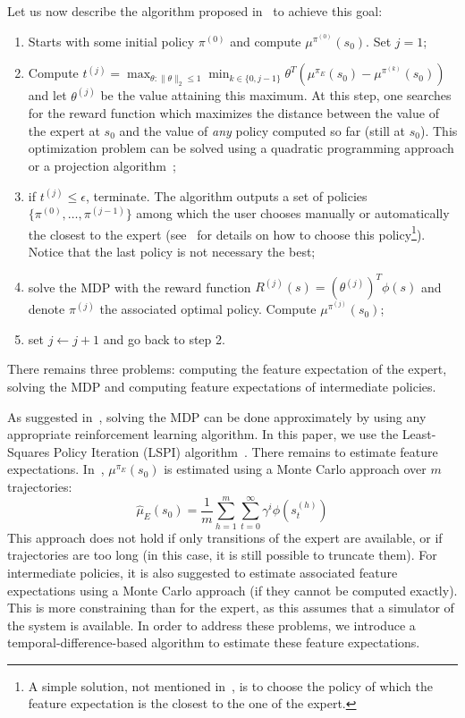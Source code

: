 \documentclass{article}
\begin{document}
Let us now describe the algorithm proposed in~\citep{abbeel2004apprenticeship} to
achieve this goal:
\begin{enumerate}
  \item Starts with some initial policy $\pi^{(0)}$ and compute
  $\mu^{\pi^{(0)}}(s_0)$. Set $j=1$;
  \item Compute $t^{(j)} = \max_{\theta: \|\theta\|_2\leq 1}
  \min_{k\in\{0,j-1\}}\theta^T(\mu^{\pi_E}(s_0) -
  \mu^{\pi^{(k)}}(s_0))$ and let $\theta^{(j)}$ be the value
  attaining this maximum. At this step, one searches for the reward
  function which maximizes the distance between the value of the
  expert at $s_0$ and the value of \emph{any} policy computed so far
  (still at $s_0$). This optimization problem can be solved using a
  quadratic programming approach or a projection
  algorithm~\citep{abbeel2004apprenticeship};
  \item if $t^{(j)}\leq \epsilon$, terminate. The algorithm outputs a
  set of policies $\{\pi^{(0)}, \dots, \pi^{(j-1)}\}$ among which
  the user chooses manually or automatically the closest to the
  expert (see~\citep{abbeel2004apprenticeship} for details on how to choose this
  policy\footnote{A simple solution, not mentioned in~\citep{abbeel2004apprenticeship},
  is to choose the policy of which the feature expectation is the
  closest to the one of the expert.}).
  Notice that the last policy is not necessary the best;
  \item solve the MDP with the reward function $R^{(j)}(s) =
  (\theta^{(j)})^T\phi(s)$ and denote $\pi^{(j)}$ the associated
  optimal policy. Compute $\mu^{\pi^{(j)}}(s_0)$;
  \item set $j\leftarrow j+1$ and go back to step 2.
\end{enumerate}
There remains three problems: computing the feature expectation of
the expert, solving the MDP and computing feature expectations of
intermediate policies.

As suggested in~\citep{abbeel2004apprenticeship}, solving the MDP can be done
approximately by using any appropriate reinforcement learning
algorithm. In this paper, we use the Least-Squares Policy Iteration
(LSPI) algorithm~\citep{lagoudakis2003least}. There remains to estimate
feature expectations. In~\citep{abbeel2004apprenticeship}, $\mu^{\pi_E}(s_0)$ is
estimated using a Monte Carlo approach over $m$ trajectories:
\begin{equation}
  \hat{\mu}_E(s_0) = \frac{1}{m} \sum_{h=1}^m \sum_{t=0}^\infty
  \gamma^i \phi(s_t^{(h)})
\end{equation}
This approach does not hold if only transitions of the expert are
available, or if trajectories are too long (in this case, it is
still possible to truncate them). For intermediate policies, it is
also suggested to estimate associated feature expectations using a
Monte Carlo approach (if they cannot be computed exactly). This is
more constraining than for the expert, as this assumes that a
simulator of the system is available. In order to address these
problems, we introduce a temporal-difference-based algorithm to
estimate these feature expectations.
\end{document}
